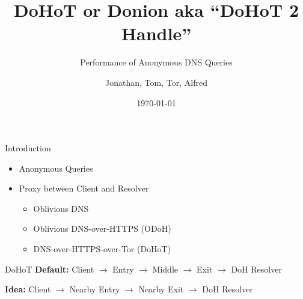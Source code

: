 \documentclass[xcolor=x11names,dvipsnames,aspectratio=169]{beamer}
\title{\huge DoHoT or Donion aka ``DoHoT 2 Handle''}
\subtitle{Performance of Anonymous DNS Queries}
\author{\small Jonathan, Tom, Tor, Alfred}
\date{\today}
\begin{document}
    \setcounter{showProgressBar}{0}
	\setcounter{showSlideNumbers}{0}

	\frame{\titlepage}

	\setcounter{framenumber}{0}
	\setcounter{showProgressBar}{1}
	\setcounter{showSlideNumbers}{1}

    \begin{frame}{Introduction}
        \begin{itemize}
            \item Anonymous Queries
            \item Proxy between Client and Resolver
            \begin{itemize}
                \item Oblivious DNS
                \item Oblivious DNS-over-HTTPS (ODoH)
                \item DNS-over-HTTPS-over-Tor (DoHoT)
            \end{itemize}
        \end{itemize}
    \end{frame}

    \begin{frame}{DoHoT}
        \textbf{Default:}
        Client $\rightarrow$
        Entry $\rightarrow$
        Middle $\rightarrow$
        Exit $\rightarrow$
        DoH Resolver

        \vspace{1em}
        \textbf{Idea:}
        Client $\rightarrow$
        Nearby Entry $\rightarrow$
        Nearby Exit $\rightarrow$
        DoH Resolver
    \end{frame}
\end{document}
